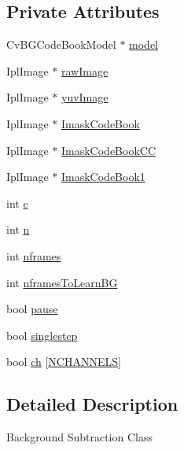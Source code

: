 \subsection*{Private Attributes}
\begin{DoxyCompactItemize}
\item 
CvBGCodeBookModel $\ast$ \hyperlink{classBackgroundSubtraction_a419efe20d02599addfa8ca980bf4a9c7}{model}
\item 
IplImage $\ast$ \hyperlink{classBackgroundSubtraction_ab3aed90e7421933c6d7d394d987aba84}{rawImage}
\item 
IplImage $\ast$ \hyperlink{classBackgroundSubtraction_abaa21c3ad9c48c1129407626f930f810}{yuvImage}
\item 
IplImage $\ast$ \hyperlink{classBackgroundSubtraction_af1e341ed6cefb35db5e493918eb778b1}{ImaskCodeBook}
\item 
IplImage $\ast$ \hyperlink{classBackgroundSubtraction_a0337dd89bdb214d7bde2adb57c3519d0}{ImaskCodeBookCC}
\item 
IplImage $\ast$ \hyperlink{classBackgroundSubtraction_a7f3f8f3c19033b0450def1fac0c70c93}{ImaskCodeBook1}
\item 
int \hyperlink{classBackgroundSubtraction_a3a6df6ed6dfe3c6fca3a7a792437dd4e}{c}
\item 
int \hyperlink{classBackgroundSubtraction_ae7bb2deb96506f56c11f411afa097ee0}{n}
\item 
int \hyperlink{classBackgroundSubtraction_a36044759437fc4f72be8e727a466a039}{nframes}
\item 
int \hyperlink{classBackgroundSubtraction_a8d778f23da4692bebcc2fe4012b49e04}{nframesToLearnBG}
\item 
bool \hyperlink{classBackgroundSubtraction_a587a1b66f073fa7165197c832ab25798}{pause}
\item 
bool \hyperlink{classBackgroundSubtraction_a7308617e19776a7695057e461e654448}{singlestep}
\item 
bool \hyperlink{classBackgroundSubtraction_ad02b87592657e60f8de9a1bc9c39e800}{ch} \mbox{[}\hyperlink{backgroundSubtraction_8h_a1e58a96c13c219f5e9ee89b743e7db0d}{NCHANNELS}\mbox{]}
\end{DoxyCompactItemize}


\subsection{Detailed Description}
Background Subtraction Class 

